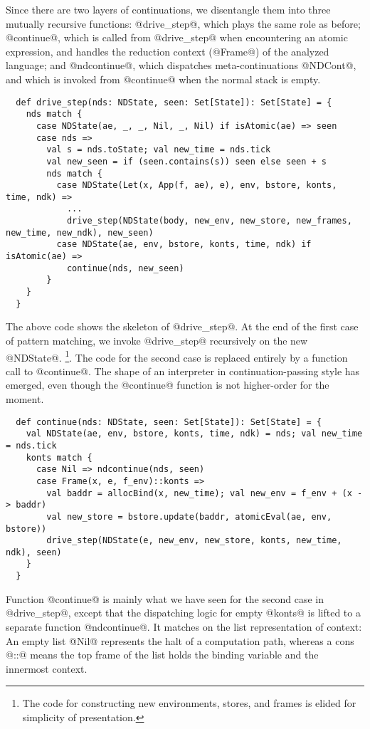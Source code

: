 \documentclass[acmsmall, review]{acmart}\settopmatter{}
\begin{document}
Since there are two layers of continuations, we disentangle them into three mutually recursive 
functions:
@drive_step@, which plays the same role as before; @continue@, which is called from
@drive_step@ when encountering an atomic expression, and handles the reduction context
(@Frame@) of the analyzed language; and @ndcontinue@, which dispatches meta-continuations
@NDCont@, and which is invoked from @continue@ when the normal stack is empty.

\begin{lstlisting}
  def drive_step(nds: NDState, seen: Set[State]): Set[State] = {
    nds match {
      case NDState(ae, _, _, Nil, _, Nil) if isAtomic(ae) => seen
      case nds =>
        val s = nds.toState; val new_time = nds.tick
        val new_seen = if (seen.contains(s)) seen else seen + s
        nds match {
          case NDState(Let(x, App(f, ae), e), env, bstore, konts, time, ndk) =>
            ...
            drive_step(NDState(body, new_env, new_store, new_frames, new_time, new_ndk), new_seen)
          case NDState(ae, env, bstore, konts, time, ndk) if isAtomic(ae) =>
            continue(nds, new_seen)
        }
    }
  }
\end{lstlisting}

The above code shows the skeleton of @drive_step@.
At the end of the first case of pattern matching, we invoke @drive_step@ recursively 
on the new @NDState@.
\footnote{The code for constructing new environments, stores, and frames is elided for 
simplicity of presentation.}.
The code for the second case is replaced entirely by a function call to @continue@.
The shape of an interpreter in continuation-passing style has emerged, even though
the @continue@ function is not higher-order for the moment.

\begin{lstlisting}
  def continue(nds: NDState, seen: Set[State]): Set[State] = {
    val NDState(ae, env, bstore, konts, time, ndk) = nds; val new_time = nds.tick
    konts match {
      case Nil => ndcontinue(nds, seen)
      case Frame(x, e, f_env)::konts =>
        val baddr = allocBind(x, new_time); val new_env = f_env + (x -> baddr)
        val new_store = bstore.update(baddr, atomicEval(ae, env, bstore))
        drive_step(NDState(e, new_env, new_store, konts, new_time, ndk), seen)
    }
  }
\end{lstlisting}

Function @continue@ is mainly what we have seen for the second case in @drive_step@,
except that the dispatching logic for empty @konts@ is lifted to a separate function 
@ndcontinue@.
It matches on the list representation of context: An empty list @Nil@ represents the
halt of a computation path, whereas a cons @::@ means the top frame of the list
holds the binding variable and the innermost context.
\end{document}
